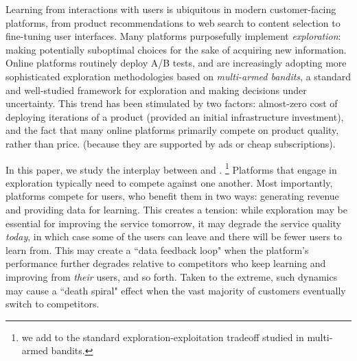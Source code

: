 
Learning from interactions with users is ubiquitous in modern customer-facing platforms, from product recommendations to web search to content selection to fine-tuning user interfaces. Many platforms purposefully implement \emph{exploration}: making potentially suboptimal choices for the sake of acquiring new information. Online platforms routinely deploy A/B tests, and are increasingly adopting  more sophisticated exploration methodologies based on \emph{multi-armed bandits}, a standard and well-studied framework for exploration and making decisions under uncertainty. This trend has been stimulated by two factors: almost-zero cost of deploying iterations of a product (provided an initial infrastructure investment), and the fact that many online platforms primarily compete on product quality, rather than price.
(\eg because they are supported by ads or cheap subscriptions).


In this paper, we study the interplay between \exploration and \competition.%
\footnote{\Ie we add \competition to the standard exploration-exploitation tradeoff studied in multi-armed bandits.}
Platforms that engage in exploration typically need to compete against one another. Most importantly, platforms compete for users, who benefit them in two ways:
generating revenue and providing data for learning. This creates a tension:
while exploration may be essential for improving the service tomorrow, it may degrade the service quality \emph{today}, in which case some of the users can leave and there will be fewer users to learn from. This may create a ``data feedback loop" when the platform's performance further degrades relative to competitors who keep learning and improving from \emph{their} users, and so forth. Taken to the extreme, such dynamics may cause a ``death spiral" effect when the vast majority of customers eventually switch to competitors.


